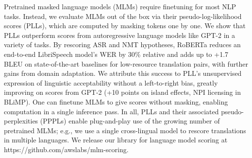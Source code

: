 Pretrained masked language models (MLMs) require finetuning for most NLP tasks. Instead, we evaluate MLMs out of the box via their pseudo-log-likelihood scores (PLLs), which are computed by masking tokens one by one. We show that PLLs outperform scores from autoregressive language models like GPT-2 in a variety of tasks. By rescoring ASR and NMT hypotheses, RoBERTa reduces an end-to-end LibriSpeech model's WER by 30\% relative and adds up to +1.7 BLEU on state-of-the-art baselines for low-resource translation pairs, with further gains from domain adaptation. We attribute this success to PLL's unsupervised expression of linguistic acceptability without a left-to-right bias, greatly improving on scores from GPT-2 (+10 points on island effects, NPI licensing in BLiMP). One can finetune MLMs to give scores without masking, enabling computation in a single inference pass. In all, PLLs and their associated pseudo-perplexities (PPPLs) enable plug-and-play use of the growing number of pretrained MLMs; e.g., we use a single cross-lingual model to rescore translations in multiple languages. We release our library for language model scoring at https://github.com/awslabs/mlm-scoring.
